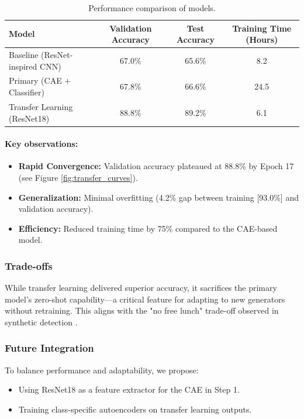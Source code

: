 \documentclass{article} %
\begin{document}
\begin{table}[h!]
\centering
\begin{tabular}{lccc}
\toprule
\textbf{Model} & \textbf{Validation Accuracy} & \textbf{Test Accuracy} & \textbf{Training Time (Hours)} \\
\midrule
Baseline (ResNet-inspired CNN) & 67.0\% & 65.6\% & 8.2 \\
Primary (CAE + Classifier) & 67.8\% & 66.6\% & 24.5 \\
Transfer Learning (ResNet18) & 88.8\% & 89.2\% & 6.1 \\
\bottomrule
\end{tabular}
\caption{Performance comparison of models.}
\end{table}

\paragraph{Key observations:}
\begin{itemize}
    \item \textbf{Rapid Convergence:} Validation accuracy plateaued at 88.8\% by Epoch 17 (see Figure \ref{fig:transfer_curves}).
    \item \textbf{Generalization:} Minimal overfitting (4.2\% gap between training [93.0\%] and validation accuracy).
    \item \textbf{Efficiency:} Reduced training time by 75\% compared to the CAE-based model.
\end{itemize}

\subsubsection{Trade-offs}
While transfer learning delivered superior accuracy, it sacrifices the primary model’s zero-shot capability—a critical feature for adapting to new generators without retraining. This aligns with the "no free lunch" trade-off observed in synthetic detection \citep{yan2024sanity}.

\subsubsection{Future Integration}
To balance performance and adaptability, we propose:
\begin{itemize}
    \item Using ResNet18 as a feature extractor for the CAE in Step 1.
    \item Training class-specific autoencoders on transfer learning outputs.
\end{itemize}
\end{document}
